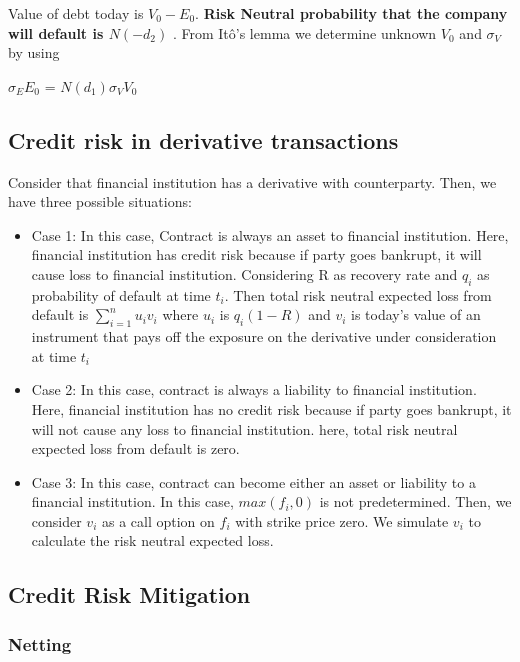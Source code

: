 \documentclass[11pt]{article}
\numberwithin{equation}{section}
\begin{document}
\hspace{1 cm} Value of debt today is $V_0 - E_0 $. \textbf{Risk Neutral probability that the company will default is $N(-d_2)$ }. From It\^{o}'s lemma we determine unknown $V_0$ and $\sigma_V$ by using
\begin{center}
	$ \sigma_E E_0 $ = $ N(d_1)\sigma_V V_0 $
\end{center}  

\subsection{Credit risk in derivative transactions}
\medskip

Consider that financial institution has a derivative with counterparty. Then, we have three possible situations:
\begin{itemize}
\item Case 1: In this case, Contract is always an asset to financial institution. Here, financial institution has credit risk because if party goes bankrupt, it will cause loss to financial institution. Considering R as recovery rate and $ q_i$ as probability of default at time  $ t_i $. Then total risk neutral expected loss from default is $\sum_{i=1}^n u_i v_i $ where $u_i $ is $q_i(1-R)$ and $ v_i $ is today's value of an instrument that pays off the exposure on the derivative under consideration at time $t_i$
\item Case 2: In this case, contract is always a liability to financial institution. Here, financial institution has no credit risk because if party goes bankrupt, it will not cause any loss to financial institution. here, total risk neutral expected loss from default is zero.
\item Case 3: In this case, contract can become either an asset or liability to a financial institution. In this case, $max(f_i,0)$ is not predetermined. Then, we consider $v_i$ as a call option on $f_i$ with strike price zero. We simulate $v_i$ to calculate the risk neutral expected loss.
\end{itemize}

\subsection{Credit Risk Mitigation}
\subsubsection{Netting} 
\medskip
\end{document}

